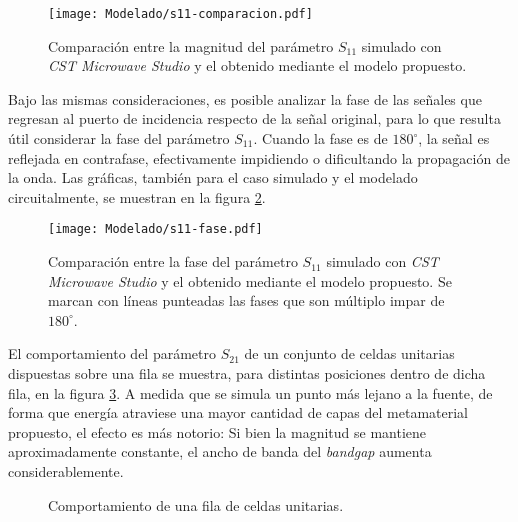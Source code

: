 \begin{figure}[h]
	\centering
	\texttt{[image: Modelado/s11-comparacion.pdf]}
	\caption{Comparación entre la magnitud del parámetro $S_{11}$ simulado con \textit{CST Microwave Studio} y el obtenido mediante el modelo propuesto.}
	\label{fig:s11_comparacion}
\end{figure}


Bajo las mismas consideraciones, es posible analizar la fase de las señales que regresan al puerto de incidencia respecto de la señal original, para lo que resulta útil considerar la fase del parámetro $S_{11}$. Cuando la fase es de $180^{\circ}$, la señal es reflejada en contrafase, efectivamente impidiendo o dificultando la propagación de la onda. Las gráficas, también para el caso simulado y el modelado circuitalmente, se muestran en la figura \ref{fig:s11-fase-compracion}.

\begin{figure}[h]
	\centering
	\texttt{[image: Modelado/s11-fase.pdf]}
	\caption{Comparación entre la fase del parámetro $S_{11}$ simulado con \textit{CST Microwave Studio} y el obtenido mediante el modelo propuesto. Se marcan con líneas punteadas las fases que son múltiplo impar de $180^{\circ}$.}
	\label{fig:s11-fase-compracion}
\end{figure}

El comportamiento del parámetro $S_{21}$ de un conjunto de celdas unitarias dispuestas sobre una fila se muestra, para distintas posiciones dentro de dicha fila, en la figura \ref{fig:s12-variacion-pila-super}. A medida que se simula un punto más lejano a la fuente, de forma que energía atraviese una mayor cantidad de capas del metamaterial propuesto, el efecto es más notorio: Si bien la magnitud se mantiene aproximadamente constante, el ancho de banda del \textit{bandgap} aumenta considerablemente.


\begin{figure}[h]
	\centering 
	\hspace{0pt}
	\caption{Comportamiento de una fila de celdas unitarias.}
	\label{fig:s12-variacion-pila-super}	
\end{figure}  

